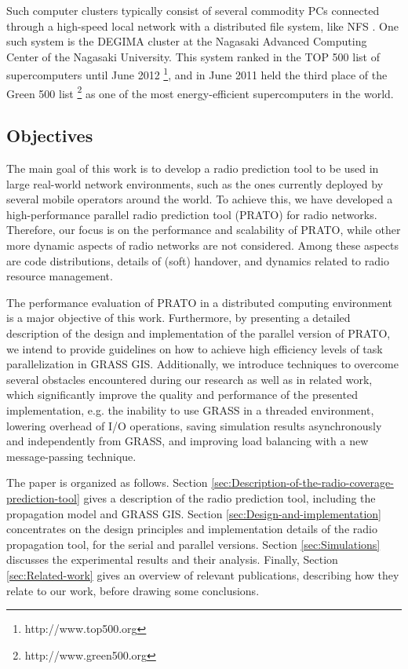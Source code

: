Such computer clusters typically consist of several commodity PCs
connected through a high-speed local network with a distributed file
system, like NFS \cite{Shepler_Network_file_system:2003}. One such
system is the DEGIMA cluster \cite{Hamada_Cluster_of_GPUs:2010} at
the Nagasaki Advanced Computing Center of the Nagasaki University.
This system ranked in the TOP 500 list of supercomputers until June
2012%
\footnote{http://www.top500.org%
}, and in June 2011 held the third place of the Green 500 list%
\footnote{http://www.green500.org%
} as one of the most energy-efficient supercomputers in the world.




\subsection{Objectives\label{sub:Objectives}}

The main goal of this work is to develop a radio prediction tool to
be used in large real-world network environments, such as the ones
currently deployed by several mobile operators around the world. To
achieve this, we have developed a high-performance parallel radio
prediction tool (PRATO) for radio networks. Therefore, our focus is
on the performance and scalability of PRATO, while other more dynamic
aspects of radio networks are not considered. Among these aspects
are code distributions, details of (soft) handover, and dynamics related
to radio resource management.



The performance evaluation of PRATO in a distributed computing environment
is a major objective of this work. Furthermore, by presenting a detailed
description of the design and implementation of the parallel version
of PRATO, we intend to provide guidelines on how to achieve high efficiency
levels of task parallelization in GRASS GIS. Additionally, we introduce
techniques to overcome several obstacles encountered during our research
as well as in related work, which significantly improve the quality
and performance of the presented implementation, e.g. the inability
to use GRASS in a threaded environment, lowering overhead of I/O operations,
saving simulation results asynchronously and independently from GRASS,
and improving load balancing with a new message-passing technique.



The paper is organized as follows. Section \ref{sec:Description-of-the-radio-coverage-prediction-tool}
gives a description of the radio prediction tool, including the propagation
model and GRASS GIS. Section \ref{sec:Design-and-implementation}
concentrates on the design principles and implementation details of
the radio propagation tool, for the serial and parallel versions.
Section \ref{sec:Simulations} discusses the experimental results
and their analysis. Finally, Section \ref{sec:Related-work} gives
an overview of relevant publications, describing how they relate to
our work, before drawing some conclusions.


